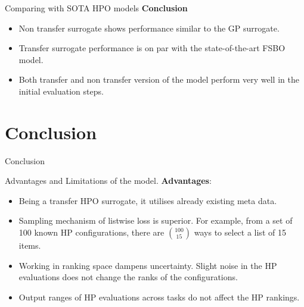 \documentclass{beamer}
\begin{document}
\begin{frame}[t]{Comparing with SOTA HPO models}
\textbf{Conclusion}
\begin{itemize}
\item Non transfer surrogate shows performance similar to the GP surrogate.
\item Transfer surrogate performance is on par with the state-of-the-art FSBO model.
\item Both transfer and non transfer version of the model perform very well in the initial evaluation steps.
\end{itemize}
\end{frame}

\section{Conclusion}
\begin{frame}
\centering
\LARGE{Conclusion}
\end{frame}

\begin{frame}[t]{Advantages and Limitations of the model.}
\textbf{Advantages}:
\begin{itemize}
\item Being a transfer HPO surrogate,  it utilises already existing meta data.
\item Sampling mechanism of listwise loss is superior.   For example,  from a set of 100 known HP configurations, there are ${100 \choose 15}$ ways to select a list of 15 items.
\item Working in ranking space dampens uncertainty. Slight noise in the HP evaluations does not change the ranks of the configurations.
\item Output ranges of HP evaluations across tasks do not affect the HP rankings.
\end{itemize}
\end{frame}
\end{document}
